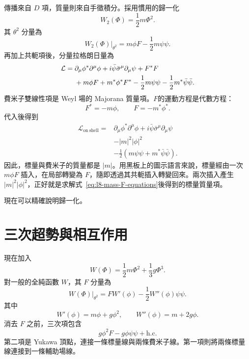 傳播來自 \(D\) 項，質量則來自手徵積分。採用慣用的歸一化
\begin{equation}
W_2(\Phi)=\frac12m\Phi^2.
\end{equation}
其 \(\theta^2\) 分量為
\begin{equation}
\left.W_2(\Phi)\right|_{\theta^2}
=m\phi F-\frac12m\psi\psi.
\end{equation}
再加上共軛項後，分量拉格朗日量為
\begin{align}
\mathcal L
={}&
\partial_\mu\phi^\ast\partial^\mu\phi
+i\bar\psi\bar\sigma^\mu\partial_\mu\psi
+F^\ast F
\notag\\
&+m\phi F+m^\ast\phi^\ast F^\ast
-\frac12m\psi\psi
-\frac12m^\ast\bar\psi\bar\psi.
\label{eq:l8-mass-offshell}
\end{align}
費米子雙線性項是 Weyl 場的 Majorana 質量項。\(F\)的運動方程是代數方程：
\begin{equation}
F^\ast=-m\phi,
\qquad
F=-m^\ast\phi^\ast.
\label{eq:l8-mass-F-equations}
\end{equation}
代入後得到
\begin{equation}
\begin{aligned}
\mathcal L_{\mathrm{on\ shell}}={}&
\partial_\mu\phi^\ast\partial^\mu\phi
+i\bar\psi\bar\sigma^\mu\partial_\mu\psi\\
&-|m|^2|\phi|^2\\
&-\frac12\left(m\psi\psi+m^\ast\bar\psi\bar\psi\right).
\end{aligned}
\label{eq:l8-mass-onshell}
\end{equation}
因此，標量與費米子的質量都是 \(|m|\)。用黑板上的圖示語言來說，標量經由一次 \(m\phi F\) 插入，在局部轉變為 \(F\)，隨即透過其共軛插入轉變回來。兩次插入產生 \(|m|^2|\phi|^2\)，正好就是求解式~\eqref{eq:l8-mass-F-equations}後得到的標量質量項。

現在可以精確說明歸一化。

\section{三次超勢與相互作用}

現在加入
\begin{equation}
W(\Phi)=\frac12m\Phi^2+\frac13g\Phi^3.
\label{eq:l8-superpotential}
\end{equation}
對一般的全純函數 \(W\)，其 \(F\) 分量為
\begin{equation}
\left.W(\Phi)\right|_{\theta^2}
=F W'(\phi)-\frac12W''(\phi)\psi\psi.
\label{eq:l8-W-components}
\end{equation}
其中
\begin{equation}
W'(\phi)=m\phi+g\phi^2,
\qquad
W''(\phi)=m+2g\phi.
\end{equation}
消去 \(F\) 之前，三次項包含
\begin{equation}
g\phi^2F-g\phi\psi\psi+\text{h.c.}
\label{eq:l8-cubic-offshell}
\end{equation}
第二項是 Yukawa 頂點，連接一條標量線與兩條費米子線。第一項則將兩條標量線連接到一條輔助場線。

